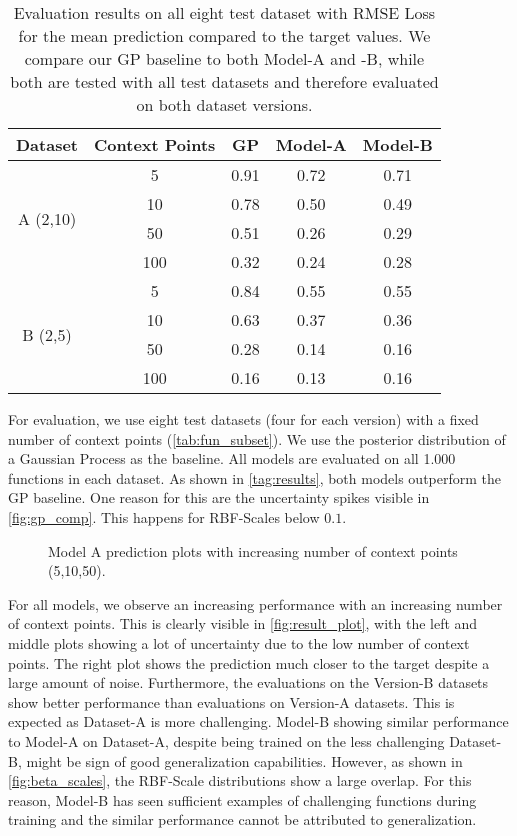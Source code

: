 \begin{table}[]
	\caption{Evaluation results on all eight test dataset with RMSE Loss for the mean prediction compared to the target values. We compare our GP baseline to both Model-A and -B, while both are tested with all test datasets and therefore evaluated on both dataset versions. }
	\begin{tabular}{c c c c c}
		\toprule
		Dataset & Context Points & GP & Model-A & Model-B\\
		\midrule
		\multirow{4}{*}{A (2,10)} & 5 & 0.91 & 0.72 & 0.71\\
		&10& 0.78 & 0.50 & 0.49\\ 
		&50 & 0.51 & 0.26 & 0.29\\
		&100 & 0.32 & 0.24 & 0.28\\\midrule
		\multirow{4}{*}{B (2,5)} & 5 & 0.84 & 0.55 & 0.55\\
		& 10 & 0.63 & 0.37 & 0.36\\
		& 50 & 0.28 & 0.14 & 0.16\\
		& 100 & 0.16 & 0.13 & 0.16\\\bottomrule
	\end{tabular}
	\label{tag:results}
\end{table}


For evaluation, we use eight test datasets (four for each version) with a fixed number of context points (\autoref{tab:fun_subset}). We use the posterior distribution of a Gaussian Process as the baseline. All models are evaluated on all 1.000 functions in each dataset.
As shown in \autoref{tag:results}, both models outperform the GP baseline. One reason for this are the uncertainty spikes visible in \autoref{fig:gp_comp}. This happens for RBF-Scales below $0.1$.

\begin{figure*}[t]
	\centering
	\resizebox{0.9\textwidth}{!}{
		
		
		
	}
	\caption{Model A prediction plots with increasing number of context points (5,10,50).}
	\label{fig:result_plot}
\end{figure*}

For all models, we observe an increasing performance with an increasing number of context points. This is clearly visible in \autoref{fig:result_plot}, with the left and middle plots showing a lot of uncertainty due to the low number of context points. The right plot shows the prediction much closer to the target despite a large amount of noise. Furthermore, the evaluations on the Version-B datasets show better performance than evaluations on Version-A datasets. This is expected as Dataset-A is more challenging. Model-B showing similar performance to Model-A on Dataset-A, despite being trained on the less challenging Dataset-B, might be sign of good generalization capabilities. However, as shown in \autoref{fig:beta_scales}, the RBF-Scale distributions show a large overlap. For this reason, Model-B has seen sufficient examples of challenging functions during training and the similar performance cannot be attributed to generalization.

